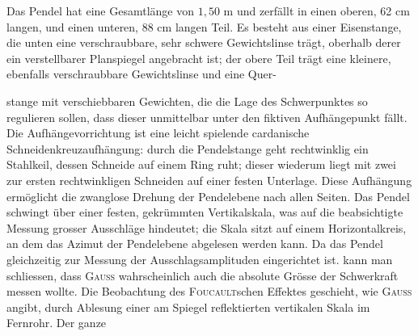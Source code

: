 Das Pendel hat eine Gesamtlänge von $1{,}50$ m und zerfällt in einen oberen,
62 cm langen, und einen unteren, 88 cm langen Teil. Es besteht aus einer
Eisenstange, die unten eine verschraubbare, sehr schwere Gewichtslinse trägt,
oberhalb derer ein verstellbarer Planspiegel angebracht ist; der obere Teil
trägt eine kleinere, ebenfalls verschraubbare Gewichtslinse und eine Quer\nobreakdash-
\clearpage{}
\noindent\begin{minipage}[t]{.66\linewidth}\vspace{0pt}
\noindent stange mit verschiebbaren Gewichten, die die Lage
des Schwerpunktes so regulieren sollen, dass dieser
unmittelbar unter den fiktiven Aufhängepunkt fällt.
Die Aufhängevorrichtung ist eine leicht spielende cardanische
Schneidenkreuzaufhängung: durch die Pendelstange
geht rechtwinklig ein Stahlkeil, dessen
Schneide auf einem Ring ruht; dieser wiederum liegt
mit zwei zur ersten rechtwinkligen Schneiden auf einer
festen Unterlage. Diese Aufhängung ermöglicht die
zwanglose Drehung der Pendelebene nach allen Seiten.
Das Pendel schwingt über einer festen, gekrümmten
Vertikalskala, was auf die beabsichtigte Messung grosser
Ausschläge hindeutet; die Skala sitzt auf einem Horizontalkreis,
an dem das Azimut der Pendelebene abgelesen
werden kann. Da das Pendel gleichzeitig zur
Messung der Ausschlagsamplituden eingerichtet ist.
kann man schliessen, dass \textsc{Gauss} wahrscheinlich auch
die absolute Grösse der Schwerkraft messen wollte. Die
Beobachtung des \textsc{Foucault}schen Effektes geschieht, wie
\textsc{Gauss} angibt, durch Ablesung einer am Spiegel reflektierten
vertikalen Skala im Fernrohr. Der ganze
\end{minipage}\hfill\begin{minipage}[t]{.31\linewidth}\vspace{0pt}\centering
{}
\end{minipage}
